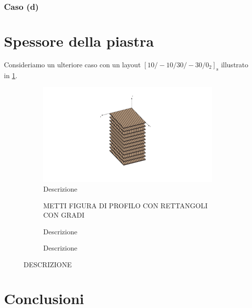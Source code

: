 \documentclass[a4paper,num-refs]{oup-contemporary}
\begin{document}
\subsubsection{Caso (d)}
\label{sec:cyl_D}
\textcolor{blue}{\lipsum[1-2]}


\section{Spessore della piastra}

Consideriamo un ulteriore caso con un layout $[10 /-10 / 30 /-30 / 0_2]_{\mathrm{s}}$ illustrato in \cref{fig:last_case_schema}. 

\begin{figure}[bt!]
	\centering
	\begin{subfigure}[t]{0.3\textwidth}
		\centering
		
		\includegraphics[width=\textwidth]{struct5.pdf}
		\caption{Descrizione}
			\label{fig:last_case_schema}
	\end{subfigure}
	\hfill
	\begin{subfigure}[t]{0.3\textwidth}
		\centering
		METTI FIGURA DI PROFILO CON RETTANGOLI CON GRADI
		\caption{Descrizione}
		
	\end{subfigure}
	\hfill
	\begin{subfigure}[t]{0.3\textwidth}
		\centering
		\caption{Descrizione}
		
	\end{subfigure}
	\hfill
	\caption{ DESCRIZIONE }
	\label{fig:last_case}
\end{figure}

\textcolor{blue}{\lipsum[1-2]}


\section{Conclusioni}
\end{document}
